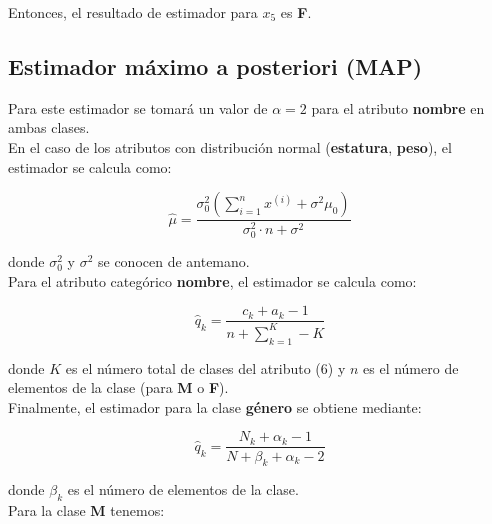 \documentclass[letterpaper,12pt]{article}
\theoremstyle{definition}
\begin{document}
Entonces, el resultado de estimador para \(x_5\) es \textbf{F}.\\

\subsection*{Estimador máximo a posteriori (MAP)}

Para este estimador se tomará un valor de \(\alpha = 2\) para el atributo \textbf{nombre} en ambas clases.\\

En el caso de los atributos con distribución normal (\textbf{estatura}, \textbf{peso}), el estimador se calcula como:

\begin{equation}
  \hat{\mu} = \frac{\sigma_0^2 (\sum_{i=1}^n x^{(i)} + \sigma^2 \mu_0)}{\sigma^2_0 \cdot n + \sigma^2}
\end{equation}

donde \(\sigma^2_0\) y \(\sigma^2\) se conocen de antemano.\\

Para el atributo categórico \textbf{nombre}, el estimador se calcula como:

\begin{equation}
  \hat{q}_k = \frac{c_k + a_k - 1}{n + \sum_{k=1}^K - K} 
\end{equation}

donde \(K\) es el número total de clases del atributo (6) y \(n\) es el número de elementos de la clase (para \textbf{M} o \textbf{F}).\\

Finalmente, el estimador para la clase \textbf{género} se obtiene mediante:

\begin{equation}
  \hat{q}_k = \frac{N_k + \alpha_k - 1}{N + \beta_k + \alpha_k - 2 }
\end{equation}

donde \(\beta_k\) es el número de elementos de la clase.\\


Para la clase \textbf{M} tenemos:\\
\end{document}
